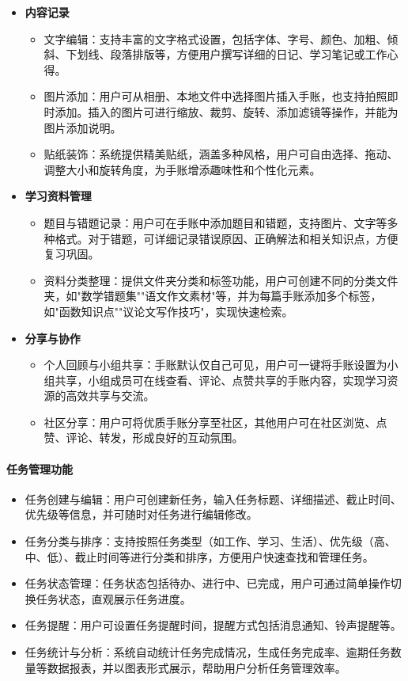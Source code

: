\documentclass[a4paper]{article}
\begin{document}
\begin{itemize}
    \item \textbf{内容记录}
    \begin{itemize}
        \item 文字编辑：支持丰富的文字格式设置，包括字体、字号、颜色、加粗、倾斜、下划线、段落排版等，方便用户撰写详细的日记、学习笔记或工作心得。
        \item 图片添加：用户可从相册、本地文件中选择图片插入手账，也支持拍照即时添加。插入的图片可进行缩放、裁剪、旋转、添加滤镜等操作，并能为图片添加说明。
        \item 贴纸装饰：系统提供精美贴纸，涵盖多种风格，用户可自由选择、拖动、调整大小和旋转角度，为手账增添趣味性和个性化元素。
    \end{itemize}
    \item \textbf{学习资料管理}
    \begin{itemize}
        \item 题目与错题记录：用户可在手账中添加题目和错题，支持图片、文字等多种格式。对于错题，可详细记录错误原因、正确解法和相关知识点，方便复习巩固。
        \item 资料分类整理：提供文件夹分类和标签功能，用户可创建不同的分类文件夹，如"数学错题集""语文作文素材"等，并为每篇手账添加多个标签，如"函数知识点""议论文写作技巧"，实现快速检索。
    \end{itemize}
    \item \textbf{分享与协作}
    \begin{itemize}
        \item 个人回顾与小组共享：手账默认仅自己可见，用户可一键将手账设置为小组共享，小组成员可在线查看、评论、点赞共享的手账内容，实现学习资源的高效共享与交流。
        \item 社区分享：用户可将优质手账分享至社区，其他用户可在社区浏览、点赞、评论、转发，形成良好的互动氛围。
    \end{itemize}
\end{itemize}

\paragraph{任务管理功能}

\begin{itemize}
    \item 任务创建与编辑：用户可创建新任务，输入任务标题、详细描述、截止时间、优先级等信息，并可随时对任务进行编辑修改。
    \item 任务分类与排序：支持按照任务类型（如工作、学习、生活）、优先级（高、中、低）、截止时间等进行分类和排序，方便用户快速查找和管理任务。
    \item 任务状态管理：任务状态包括待办、进行中、已完成，用户可通过简单操作切换任务状态，直观展示任务进度。
    \item 任务提醒：用户可设置任务提醒时间，提醒方式包括消息通知、铃声提醒等。
    \item 任务统计与分析：系统自动统计任务完成情况，生成任务完成率、逾期任务数量等数据报表，并以图表形式展示，帮助用户分析任务管理效率。
\end{itemize}
\end{document}
